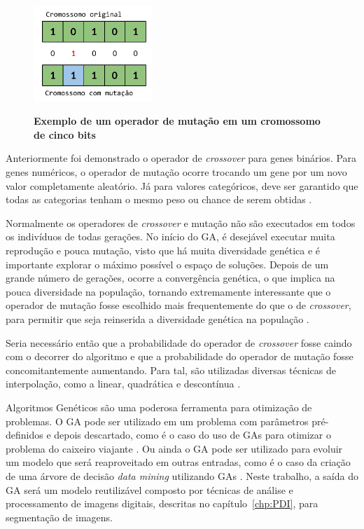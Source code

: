 \documentclass[12pt,oneside,a4paper,english,french,spanish,brazil,]{abntex2}
\begin{document}
\begin{figure}[ht]
\centering
\caption{\textbf{Exemplo de um operador de mutação em um cromossomo de cinco bits}}
\includegraphics[width=0.4\textwidth]{imagens/GA_Mutacao.pdf}
\label{fig:GA_Mutacao}
\end{figure}

Anteriormente foi demonstrado o operador de \textit{crossover} para genes binários. Para genes numéricos, o operador de mutação ocorre trocando um gene por um novo valor completamente aleatório. Já para valores categóricos, deve ser garantido que todas as categorias tenham o mesmo peso ou chance de serem obtidas \cite{linden:2008}.

Normalmente os operadores de \textit{crossover} e mutação não são executados em todos os indivíduos de todas gerações. No início do GA, é desejável executar muita reprodução e pouca mutação, visto que há muita diversidade genética e é importante explorar o máximo possível o espaço de soluções. Depois de um grande número de gerações, ocorre a convergência genética, o que implica na pouca diversidade na população, tornando extremamente interessante que o operador de mutação fosse escolhido mais frequentemente do que o de \textit{crossover}, para permitir que seja reinserida a diversidade genética na população \cite{linden:2008}.

Seria necessário então que a probabilidade do operador de \textit{crossover} fosse caindo com o decorrer do algoritmo e que a probabilidade do operador de mutação fosse concomitantemente aumentando. Para tal, são utilizadas diversas técnicas de interpolação, como a linear, quadrática e descontínua \cite{linden:2008}.

Algoritmos Genéticos são uma poderosa ferramenta para otimização de problemas. O GA pode ser utilizado em um problema com parâmetros pré-definidos e depois descartado, como é o caso do uso de GAs para otimizar o problema do caixeiro viajante \cite{grefenstette:1985}. Ou ainda o GA pode ser utilizado para evoluir um modelo que será reaproveitado em outras entradas, como é o caso da criação de uma árvore de decisão \textit{data mining} utilizando GAs \cite{carvalho:2004}. Neste trabalho, a saída do GA será um modelo reutilizável composto por técnicas de análise e processamento de imagens digitais, descritas no capítulo~\ref{chp:PDI}, para segmentação de imagens.
\end{document}
